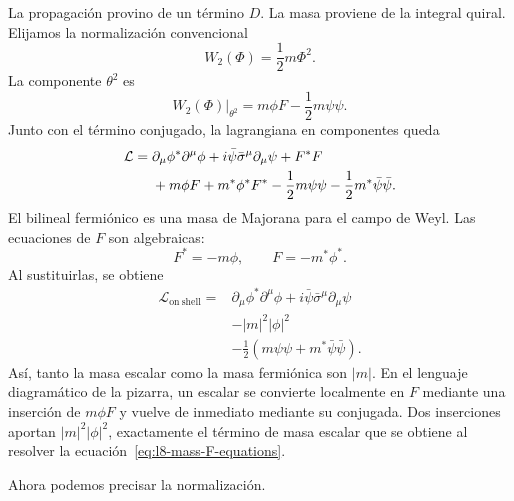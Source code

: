 La propagación provino de un término \(D\). La masa proviene de la integral quiral. Elijamos la normalización convencional
\begin{equation}
W_2(\Phi)=\frac12m\Phi^2.
\end{equation}
La componente \(\theta^2\) es
\begin{equation}
\left.W_2(\Phi)\right|_{\theta^2}
=m\phi F-\frac12m\psi\psi.
\end{equation}
Junto con el término conjugado, la lagrangiana en componentes queda
\begin{align}
\mathcal L
={}&
\partial_\mu\phi^\ast\partial^\mu\phi
+i\bar\psi\bar\sigma^\mu\partial_\mu\psi
+F^\ast F
\notag\\
&+m\phi F+m^\ast\phi^\ast F^\ast
-\frac12m\psi\psi
-\frac12m^\ast\bar\psi\bar\psi.
\label{eq:l8-mass-offshell}
\end{align}
El bilineal fermiónico es una masa de Majorana para el campo de Weyl. Las ecuaciones de \(F\) son algebraicas:
\begin{equation}
F^\ast=-m\phi,
\qquad
F=-m^\ast\phi^\ast.
\label{eq:l8-mass-F-equations}
\end{equation}
Al sustituirlas, se obtiene
\begin{equation}
\begin{aligned}
\mathcal L_{\mathrm{on\ shell}}={}&
\partial_\mu\phi^\ast\partial^\mu\phi
+i\bar\psi\bar\sigma^\mu\partial_\mu\psi\\
&-|m|^2|\phi|^2\\
&-\frac12\left(m\psi\psi+m^\ast\bar\psi\bar\psi\right).
\end{aligned}
\label{eq:l8-mass-onshell}
\end{equation}
Así, tanto la masa escalar como la masa fermiónica son \(|m|\). En el lenguaje diagramático de la pizarra, un escalar se convierte localmente en \(F\) mediante una inserción de \(m\phi F\) y vuelve de inmediato mediante su conjugada. Dos inserciones aportan \(|m|^2|\phi|^2\), exactamente el término de masa escalar que se obtiene al resolver la ecuación~\eqref{eq:l8-mass-F-equations}.

Ahora podemos precisar la normalización.


